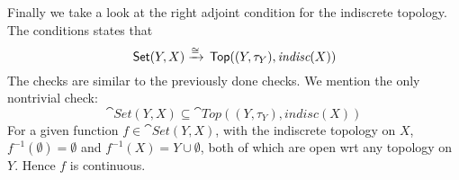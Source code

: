 \begin{frame}
    Finally we take a look at the right adjoint condition for the indiscrete
    topology. The conditions states that 
    \begin{equation}
         \,\textsf{Set}(Y,X ) \xrightarrow{\cong} \,\textsf{Top}((Y, \tau_Y) ,\textit{indisc}(X))
    \end{equation}
    The checks are similar to the previously done checks.  We mention the only
    nontrivial check: 
    \begin{equation}
        \cat{Set}(Y,X ) \subseteq\cat{Top}((Y, \tau_Y) ,\textit{indisc}(X))
    \end{equation}
    For a given function \(f \in   \cat{Set}(Y,X )\), with the indiscrete
    topology on \(X\), \(f^{-1}(\emptyset) = \emptyset\) and \(f^{-1}(X) = Y
    \cup \emptyset\), both of which are open wrt any topology on \(Y\). Hence
    \(f\) is continuous. 

\end{frame}
